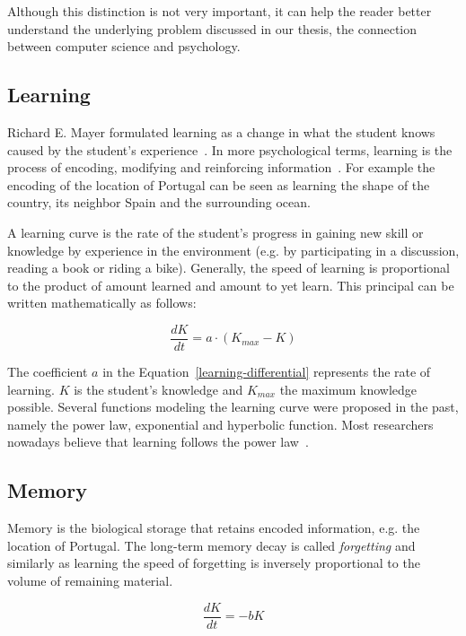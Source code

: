Although this distinction is not very important, it can help the reader better understand the underlying problem discussed in our thesis, the connection between computer science and psychology.

\subsection{Learning}
\label{learning}

Richard E. Mayer formulated learning as a change in what the student knows caused by the student's experience~\cite{RichardE.Mayer2010}. In more psychological terms, learning is the process of encoding, modifying and reinforcing information~\cite{Lewis}. For example the encoding of the location of Portugal can be seen as learning the shape of the country, its neighbor Spain and the surrounding ocean.

A learning curve is the rate of the student's progress in gaining new skill or knowledge by experience in the environment (e.g. by participating in a discussion, reading a book or riding a bike). Generally, the speed of learning is proportional to the product of amount learned and amount to yet learn. This principal can be written mathematically as follows:

\begin{equation} \label{learning-differential}
  \frac{dK}{dt} = a \cdot (K_{max} - K)
\end{equation}

The coefficient $a$ in the Equation~\ref{learning-differential} represents the rate of learning. $K$ is the student's knowledge and $K_{max}$ the maximum knowledge possible. Several functions modeling the learning curve were proposed in the past, namely the power law, exponential and hyperbolic function. Most researchers nowadays believe that learning follows the power law~\cite{Klusasek2014}.

\subsection{Memory}
\label{memory}

Memory is the biological storage that retains encoded information, e.g. the location of Portugal. The long-term memory decay is called \textit{forgetting} and similarly as learning the speed of forgetting is inversely proportional to the volume of remaining material.

\begin{equation} \label{forgetting-differential}
  \frac{dK}{dt} = -bK
\end{equation}

